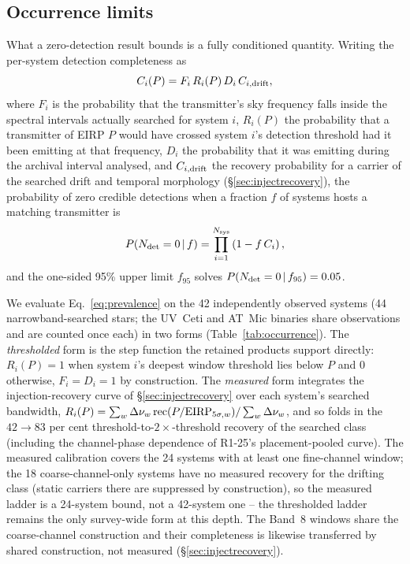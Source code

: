 \documentclass{openjournal}
\begin{document}
\subsection{Occurrence limits}

What a zero-detection result bounds is a fully conditioned quantity.
Writing the per-system detection completeness as
\begin{equation}
C_i(P) = F_i\,R_i(P)\,D_i\,C_{i,\rm drift},
\label{eq:conditioning}
\end{equation}
where $F_i$ is the probability that the transmitter's sky frequency
falls inside the spectral intervals actually searched for system $i$,
$R_i(P)$ the probability that a transmitter of EIRP $P$ would have
crossed system $i$'s detection threshold had it been emitting at that
frequency, $D_i$ the probability that it was emitting during the
archival interval analysed, and $C_{i,\rm drift}$ the recovery
probability for a carrier of the searched drift and temporal
morphology (\S\ref{sec:injectrecovery}), the probability of zero
credible detections when a fraction $f$ of systems hosts a matching
transmitter is
\begin{equation}
P(N_{\rm det}=0\,|\,f)=\prod_{i=1}^{N_{\rm sys}}\left(1-f\,C_i\right),
\label{eq:prevalence}
\end{equation}
and the one-sided 95\% upper limit $f_{95}$ solves
$P(N_{\rm det}=0\,|\,f_{95})=0.05$.

\noindent{}

\noindent We evaluate Eq.~\ref{eq:prevalence} on the 42 independently
observed systems (44 narrowband-searched stars; the UV~Ceti and
AT~Mic binaries share observations and are counted once each) in two
forms (Table~\ref{tab:occurrence}). The \emph{thresholded} form is the
step function the retained products support directly: $R_i(P)=1$ when
system $i$'s deepest window threshold lies below $P$ and 0 otherwise,
$F_i=D_i=1$ by construction. The \emph{measured} form integrates the
injection-recovery curve of \S\ref{sec:injectrecovery} over each
system's searched bandwidth,
$R_i(P) = \sum_w \Delta\nu_w\, {\rm rec}(P/{\rm
EIRP}_{5\sigma,w}) / \sum_w \Delta\nu_w$, and so folds in the
$42\rightarrow83$ per cent threshold-to-$2\times$-threshold recovery
of the searched class (including the channel-phase dependence of
R1-25's placement-pooled curve). The measured calibration covers the
24 systems with at least one fine-channel window; the 18
coarse-channel-only systems have no measured recovery for the drifting
class (static carriers there are suppressed by construction), so the
measured ladder is a 24-system bound, not a 42-system one -- the
thresholded ladder remains the only survey-wide form at this depth.
The Band~8 windows share the coarse-channel construction and their
completeness is likewise transferred by shared construction, not
measured (\S\ref{sec:injectrecovery}).
\end{document}
